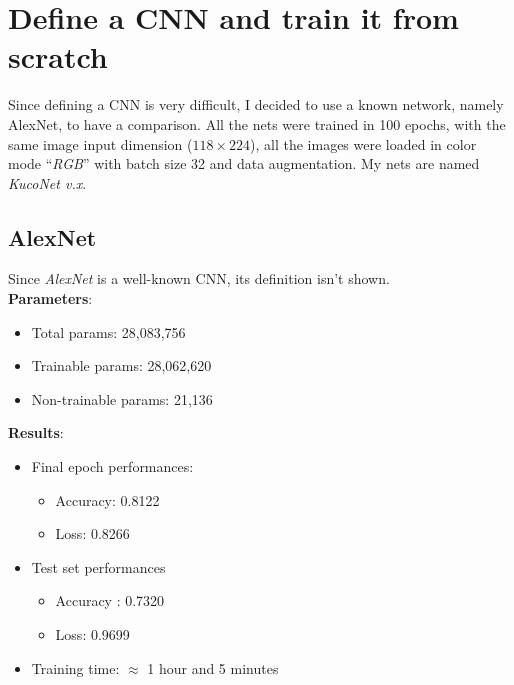 \documentclass[11pt]{article}
\begin{document}
\section{Define a CNN and train it from scratch}
Since defining a CNN is very difficult, I decided to use a known network, namely AlexNet, to have a comparison. All the nets were trained in 100 epochs, with the same image input dimension ($118 \times 224$), all the images were loaded in color mode ``\textit{RGB}'' with batch size 32 and data augmentation. My nets are named \textit{KucoNet v.x}.

\subsection{AlexNet}
Since \textit{AlexNet} is a well-known CNN, its definition isn't shown. \\
\textbf{Parameters}:
\begin{itemize}
	\item Total params: 28,083,756
	\item Trainable params: 28,062,620
	\item Non-trainable params: 21,136
\end{itemize}
\textbf{Results}:
\begin{itemize}
	\item Final epoch performances:
	\begin{itemize}
		\item Accuracy: 0.8122
		\item Loss: 0.8266
	\end{itemize}
	\item Test set performances
	\begin{itemize}
		\item Accuracy : 0.7320
		\item Loss: 0.9699
	\end{itemize}
	\item Training time: $\approx$ 1 hour and 5 minutes
\end{itemize}
\end{document}
